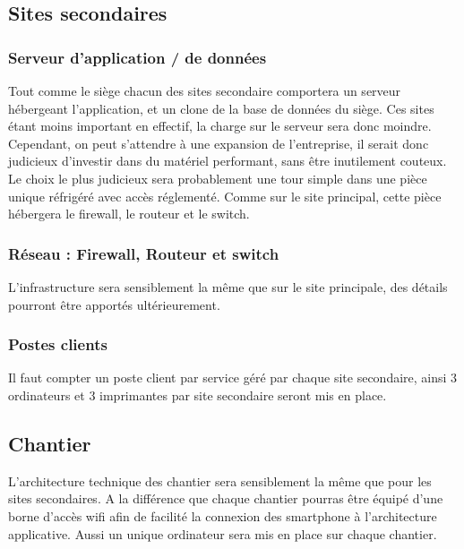     \subsection{Sites secondaires}

        \subsubsection{Serveur d'application / de données}
            Tout comme le siège chacun des sites secondaire comportera un serveur hébergeant l'application, et un clone de la base de données du siège. Ces sites étant moins important en effectif, la charge sur le serveur sera donc moindre. Cependant, on peut s'attendre à une expansion de l'entreprise, il serait donc judicieux d'investir dans du matériel performant, sans être inutilement couteux. Le choix le plus judicieux sera probablement une tour simple dans une pièce unique réfrigéré avec accès réglementé. Comme sur le site principal, cette pièce hébergera le firewall, le routeur et le switch.

        \subsubsection{Réseau : Firewall, Routeur et switch}
            L'infrastructure sera sensiblement la même que sur le site principale, des détails pourront être apportés ultérieurement.

        \subsubsection{Postes clients}
            Il faut compter un poste client par service géré par chaque site secondaire, ainsi 3 ordinateurs et 3 imprimantes par site secondaire seront mis en place.

    \subsection{Chantier}
        L'architecture technique des chantier sera sensiblement la même que pour les sites secondaires.
        A la différence que chaque chantier pourras être équipé d'une borne d'accès wifi afin de facilité la connexion des smartphone à l'architecture applicative. Aussi un unique ordinateur sera mis en place sur chaque chantier.




